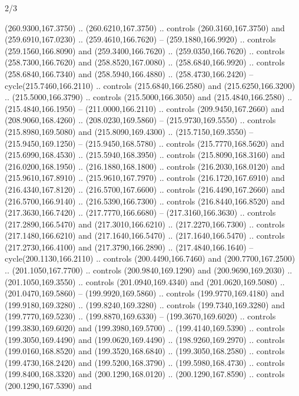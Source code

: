 \begin{flagdescription}{2/3}
\begin{scope}[xshift=0.5\flaglength,yshift=0.5\flagwidth,scale=\flagwidth/259.2]
\begin{scope}[y=0.8pt, x=0.8pt, yscale=-1,shift={(-243,-162)}]
      (260.9300,167.3750) .. (260.6210,167.3750) .. controls (260.3160,167.3750) and
      (259.6910,167.0230) .. (259.4610,166.7620) -- (259.1880,166.9920) .. controls
      (259.1560,166.8090) and (259.3400,166.7620) .. (259.0350,166.7620) .. controls
      (258.7300,166.7620) and (258.8520,167.0080) .. (258.6840,166.9920) .. controls
      (258.6840,166.7340) and (258.5940,166.4880) .. (258.4730,166.2420) --
      cycle(215.7460,166.2110) .. controls (215.6840,166.2580) and
      (215.6250,166.3200) .. (215.5000,166.3790) .. controls (215.5000,166.3050) and
      (215.4840,166.2580) .. (215.4840,166.1950) -- (211.0000,166.2110) .. controls
      (209.9450,167.2660) and (208.9060,168.4260) .. (208.0230,169.5860) --
      (215.9730,169.5550) .. controls (215.8980,169.5080) and (215.8090,169.4300) ..
      (215.7150,169.3550) -- (215.9450,169.1250) -- (215.9450,168.5780) .. controls
      (215.7770,168.5620) and (215.6990,168.4530) .. (215.5940,168.3950) .. controls
      (215.8090,168.3160) and (216.0200,168.1950) .. (216.1880,168.1800) .. controls
      (216.2030,168.0120) and (215.9610,167.8910) .. (215.9610,167.7970) .. controls
      (216.1720,167.6910) and (216.4340,167.8120) .. (216.5700,167.6600) .. controls
      (216.4490,167.2660) and (216.5700,166.9140) .. (216.5390,166.7300) .. controls
      (216.8440,166.8520) and (217.3630,166.7420) .. (217.7770,166.6680) --
      (217.3160,166.3630) .. controls (217.2890,166.5470) and (217.3010,166.6210) ..
      (217.2270,166.7300) .. controls (217.1480,166.6210) and (217.1640,166.5470) ..
      (217.1640,166.5470) .. controls (217.2730,166.4100) and (217.3790,166.2890) ..
      (217.4840,166.1640) -- cycle(200.1130,166.2110) .. controls
      (200.4490,166.7460) and (200.7700,167.2500) .. (201.1050,167.7700) .. controls
      (200.9840,169.1290) and (200.9690,169.2030) .. (201.1050,169.3550) .. controls
      (201.0940,169.4340) and (201.0620,169.5080) .. (201.0470,169.5860) --
      (199.9920,169.5860) .. controls (199.9770,169.4180) and (199.9180,169.3280) ..
      (199.8240,169.3280) .. controls (199.7340,169.3280) and (199.7770,169.5230) ..
      (199.8870,169.6330) -- (199.3670,169.6020) .. controls (199.3830,169.6020) and
      (199.3980,169.5700) .. (199.4140,169.5390) .. controls (199.3050,169.4490) and
      (199.0620,169.4490) .. (198.9260,169.2970) .. controls (199.0160,168.8520) and
      (199.3520,168.6840) .. (199.3050,168.2580) .. controls (199.4730,168.2420) and
      (199.5200,168.3790) .. (199.5980,168.4730) .. controls (199.8400,168.3320) and
      (200.1290,168.0120) .. (200.1290,167.8590) .. controls (200.1290,167.5390) and

\end{scope}
\end{scope}
\end{flagdescription}
